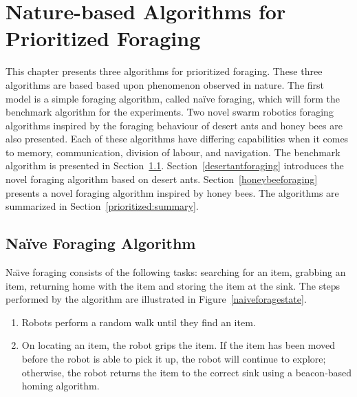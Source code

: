 
\chapter{Nature-based Algorithms for Prioritized Foraging}
\label{chap:third}


This chapter presents three algorithms for prioritized foraging. These three algorithms are based based upon phenomenon observed in nature. The first model is a simple foraging algorithm, called na\"ive foraging, which will form the benchmark algorithm for the experiments. Two novel swarm robotics foraging algorithms inspired by the foraging behaviour of desert ants and honey bees are also presented. Each of these algorithms have differing capabilities when it comes to memory, communication, division of labour, and navigation. The benchmark algorithm is presented in Section~\ref{naiveforaging}. Section~\ref{desertantforaging} introduces the novel foraging algorithm based on desert ants. Section~\ref{honeybeeforaging} presents a novel foraging algorithm inspired by honey bees. The algorithms are summarized in Section~\ref{prioritized:summary}.

\section{Na\"ive Foraging Algorithm}
\label{naiveforaging}

 Na\"\i ve foraging consists of the following tasks: searching for an item, grabbing an item, returning home with the item and storing the item at the sink. The steps performed by the algorithm are illustrated in Figure~\ref{naiveforagestate}.  

\begin{enumerate}
	\item Robots perform a random walk until they find an item.
	\item On locating an item, the robot grips the item. If the item has been moved before the robot is able to pick it up, the robot will continue to explore; otherwise, the robot returns the item to the correct sink using a beacon-based homing algorithm.
\end{enumerate}



